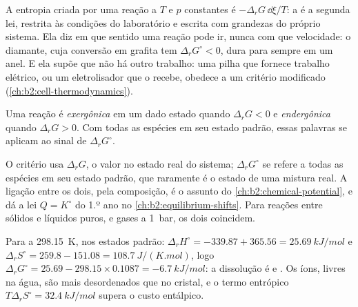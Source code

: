 \begin{remark}\label{rem:b2:reaction-free-energy:criterion}
A entropia criada por uma reação a $T$ e $p$ constantes é $-\Delta_r G\,
\dd\xi/T$: a  é a segunda lei, restrita às condições
do laboratório e escrita com grandezas do próprio sistema. Ela diz
em que sentido uma reação pode ir, nunca com que velocidade: o diamante,
cuja conversão em grafita tem $\Delta_r G^\circ < 0$, dura para sempre em
um anel. E ela supõe que não há outro trabalho: uma pilha que fornece
trabalho elétrico, ou um eletrolisador que o recebe, obedece a um critério
modificado (\cref{ch:b2:cell-thermodynamics}).
\end{remark}

\begin{definition}\label{def:b2:reaction-free-energy:exergonic}
Uma reação é \emph{exergônica} em um dado estado quando
$\Delta_r G < 0$ e \emph{endergônica} quando $\Delta_r G >
0$. Com todas as espécies em seu estado padrão, essas palavras se aplicam ao
sinal de $\Delta_r G^\circ$.
\end{definition}

O critério usa $\Delta_r G$, o valor no estado real do
sistema; $\Delta_r G^\circ$ se refere a todas as espécies em seu estado
padrão, que raramente é o estado de uma mistura real. A ligação entre os
dois, pela composição, é o assunto do \cref{ch:b2:chemical-potential}, e
dá a lei $Q = K^\circ$ do 1.º ano no \cref{ch:b2:equilibrium-shifts}. Para
reações entre sólidos e líquidos puros, e gases a \qty{1}{bar}, os
dois coincidem.

\begin{example}\label{ex:b2:reaction-free-energy:cold-pack}
Para  a \qty{298.15}{K}, nos estados
padrão: $\Delta_r H^\circ = -339.87 + 365.56 = \qty{+25.69}{kJ/mol}$ e
$\Delta_r S^\circ = 259.8 - 151.08 = \qty{+108.7}{J/(K.mol)}$, logo
$\Delta_r G^\circ = 25.69 - 298.15 \times 0.1087 = \qty{-6.7}{kJ/mol}$: a
dissolução é  e . Os íons, livres na água, são
mais desordenados que no cristal, e o termo entrópico $T\Delta_r
S^\circ = \qty{32.4}{kJ/mol}$ supera o custo entálpico.
\end{example}

